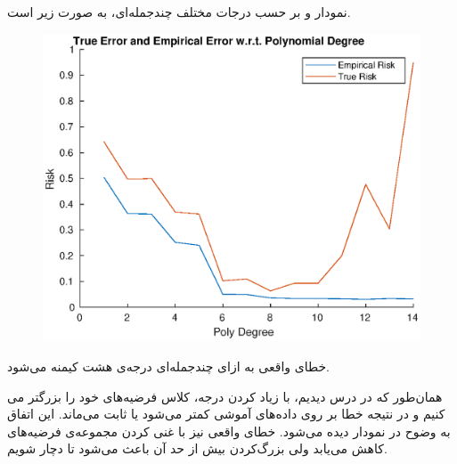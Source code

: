 \documentclass[a4paper]{article}
\begin{document}
 نمودار 
و 
بر حسب درجات مختلف چندجمله‌ای، به صورت زیر است.
\begin{figure}[h]
	\centering
	\includegraphics[scale = 0.8]{curves.eps}
\end{figure}

خطای واقعی به ازای چندجمله‌ای درجه‌ی هشت کیمنه می‌شود. 

همان‌طور که در درس دیدیم، با زیاد کردن درجه، کلاس فرضیه‌های خود را بزرگتر می کنیم و در نتیجه خطا بر روی داده‌های آموشی کمتر می‌شود یا ثابت می‌ماند. این اتفاق به وضوح در نمودار دیده می‌شود. 
خطای واقعی نیز با غنی کردن مجموعه‌ی فرضیه‌های کاهش می‌یابد ولی بزرگ‌کردن بیش از حد آن باعث می‌شود تا دچار
شویم.
\end{document}
